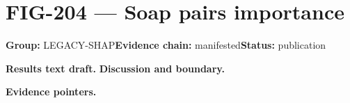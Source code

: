 \clearpage
\section{FIG-204 --- Soap pairs importance}
\label{figpage:fig-204}
\textbf{Group:} LEGACY-SHAP\quad \textbf{Evidence chain:} manifested\quad \textbf{Status:} publication

\textbf{Results text draft.} 
\textbf{Discussion and boundary.} 


\textbf{Evidence pointers.}



\vfill
